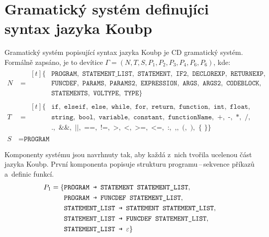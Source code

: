 \section{Gramatický systém definujíci syntax jazyka Koubp}
Gramatický systém popisující syntax jazyka Koubp je CD gramatický systém.
Formálně zapsáno, je to devítice $\Gamma = (N, T, S, P_1, P_2, P_3, P_4, P_6, P_6)$, kde:
\begin{align*}
    N & = 
        \begin{aligned}[t]
          \{&\texttt{PROGRAM}, \texttt{ STATEMENT\_LIST}, \texttt{ STATEMENT}, \texttt{ IF2}, \texttt{ DECLOREXP}, \texttt{ RETURNEXP},\\
            &\texttt{FUNCDEF}, \texttt{ PARAMS}, \texttt{ PARAMS2}, \texttt{ EXPRESSION}, \texttt{ ARGS}, \texttt{ ARGS2}, \texttt{ CODEBLOCK},\\
            &\texttt{STATEMENTS}, \texttt{ VOLTYPE}, \texttt{ TYPE}\}
        \end{aligned}\\
    T & = 
        \begin{aligned}[t]
          \{&\texttt{if}, \texttt{ elseif}, \texttt{ else}, \texttt{ while}, \texttt{ for}, \texttt{ return}, \texttt{ function}, \texttt{ int}, \texttt{ float},\\
            &\texttt{string}, \texttt{ bool}, \texttt{ variable}, \texttt{ constant}, \texttt{ functionName}, \texttt{ +}, \texttt{ -}, \texttt{ *}, \texttt{ /},\\
            &\texttt{.}, \texttt{ \&\&}, \texttt{ ||}, \texttt{ ==}, \texttt{ !=}, \texttt{ >}, \texttt{ <}, \texttt{ >=}, \texttt{ <=}, \texttt{ :}, \texttt{ ,}, \texttt{ (}, \texttt{ )}, \texttt{ \{} \texttt{ \}}\}
        \end{aligned}\\
    S & = \texttt{PROGRAM}
\end{align*}



Komponenty systému jsou navrhnuty tak, aby každá z~nich tvořila ucelenou část jazyka Koubp.
První komponenta popisuje strukturu programu\,--\,sekvence příkazů a~definic funkcí.
\begin{equation*}
    P_1 = \{ 
        \begin{aligned}[t] 
            &\texttt{PROGRAM \textrightarrow{} STATEMENT STATEMENT\textunderscore LIST},\\
            &\texttt{PROGRAM \textrightarrow{} FUNCDEF STATEMENT\textunderscore LIST},\\
            &\texttt{STATEMENT\textunderscore LIST \textrightarrow{} STATEMENT STATEMENT\textunderscore LIST},\\
            &\texttt{STATEMENT\textunderscore LIST \textrightarrow{} FUNCDEF STATEMENT\textunderscore LIST},\\
            &\texttt{STATEMENT\textunderscore LIST \textrightarrow{} }\varepsilon\}
        \end{aligned}
\end{equation*}

